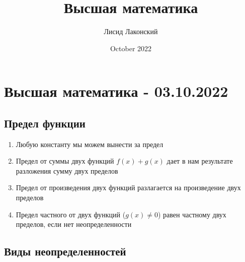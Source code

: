 \documentclass{article}
\title{Высшая математика}
\author{Лисид Лаконский}
\date{October 2022}
\begin{document}
\maketitle

\tableofcontents
\pagebreak

\section{Высшая математика - 03.10.2022}

\subsection{Предел функции}

\begin{enumerate}
    \item Любую константу мы можем вынести за предел
    \item Предел от суммы двух функций $f(x) + g(x)$ дает в нам результате разложения сумму двух пределов
    \item Предел от произведения двух функций разлагается на произведение двух пределов
    \item Предел частного от двух функций ($g(x) \ne 0$) равен частному двух пределов, если нет неопределенности
\end{enumerate}

\subsection{Виды неопределенностей}
\end{document}

